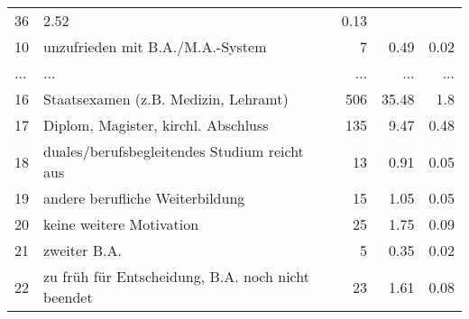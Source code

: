 \begin{longtable}{lXrrr}
          \num{36} &
          \num[round-mode=places,round-precision=2]{2.52} &
          \num[round-mode=places,round-precision=2]{0.13} \\
        10 & \multicolumn{1}{X}{unzufrieden mit B.A./M.A.-System} & %
          \num{7} &
          \num[round-mode=places,round-precision=2]{0.49} &
          \num[round-mode=places,round-precision=2]{0.02} \\
       ... & ... & ... & ... & ... \\
        16 & \multicolumn{1}{X}{Staatsexamen (z.B. Medizin, Lehramt)} & %
          \num{506} &
          \num[round-mode=places,round-precision=2]{35.48} &
          \num[round-mode=places,round-precision=2]{1.8} \\

        17 & \multicolumn{1}{X}{Diplom, Magister, kirchl. Abschluss} & %
          \num{135} &
          \num[round-mode=places,round-precision=2]{9.47} &
          \num[round-mode=places,round-precision=2]{0.48} \\

        18 & \multicolumn{1}{X}{duales/berufsbegleitendes Studium reicht aus} & %
          \num{13} &
          \num[round-mode=places,round-precision=2]{0.91} &
          \num[round-mode=places,round-precision=2]{0.05} \\

        19 & \multicolumn{1}{X}{andere berufliche Weiterbildung} & %
          \num{15} &
          \num[round-mode=places,round-precision=2]{1.05} &
          \num[round-mode=places,round-precision=2]{0.05} \\

        20 & \multicolumn{1}{X}{keine weitere Motivation} & %
          \num{25} &
          \num[round-mode=places,round-precision=2]{1.75} &
          \num[round-mode=places,round-precision=2]{0.09} \\

        21 & \multicolumn{1}{X}{zweiter B.A.} & %
          \num{5} &
          \num[round-mode=places,round-precision=2]{0.35} &
          \num[round-mode=places,round-precision=2]{0.02} \\

        22 & \multicolumn{1}{X}{zu früh für Entscheidung, B.A. noch nicht beendet} & %
          \num{23} &
          \num[round-mode=places,round-precision=2]{1.61} &
          \num[round-mode=places,round-precision=2]{0.08} \\


\end{longtable}

